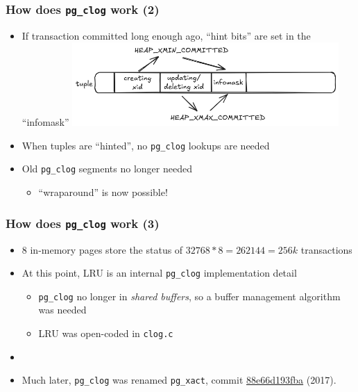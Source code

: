 \begin{frame}
  \frametitle{How does \texttt{pg\_clog} work (2)}
  \begin{itemize}
    \item If transaction committed long enough ago, ``hint bits'' are set
      in the ``infomask''
      \includegraphics[width=0.80\textwidth]{tuple-hinted.png}
    \item When tuples are ``hinted'', no \texttt{pg\_clog} lookups are needed
    \item Old \texttt{pg\_clog} segments no longer needed
      \begin{itemize}
    \item ``wraparound'' is now possible!
      \end{itemize}
  \end{itemize}
\end{frame}

\begin{frame}
  \frametitle{How does \texttt{pg\_clog} work (3)}
  \begin{itemize}

    \item 8 in-memory pages store the status of $ 32768 * 8 = 262144 = 256k $ transactions
    \item At this point, LRU is an internal \texttt{pg\_clog} implementation detail
      \begin{itemize}
	\item \texttt{pg\_clog} no longer in \textit{shared buffers}, so a buffer management algorithm was needed
	\item LRU was open-coded in \texttt{clog.c}
      \end{itemize}
    \item[]
    \item Much later, \texttt{pg\_clog} was renamed \texttt{pg\_xact}, 
      commit \href{https://git.postgresql.org/cgit/postgresql.git/commit/?id=88e66d193fba}{88e66d193fba} (2017).
  \end{itemize}
\end{frame}


